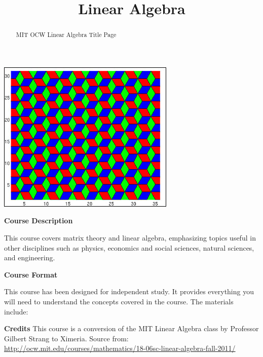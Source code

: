 \documentclass{ximera}
\title{Linear Algebra}
\begin{document}
\begin{abstract}
  MIT OCW Linear Algebra Title Page
\end{abstract}\maketitle

\begin{center}
\includegraphics{Main.jpg}
\end{center}
\noindent
\textbf{Course Description}
\par
\noindent
This course covers matrix theory and linear algebra, emphasizing topics useful in other disciplines such as physics, economics and social sciences, natural sciences, and engineering.
\par
\noindent
\textbf{Course Format}
\par
\noindent
This course has been designed for independent study. It provides everything you will need to understand the concepts covered in the course. The materials include:
\par
\noindent
\textbf{Credits}
This course is a conversion of the MIT Linear Algebra class by Professor Gilbert Strang to Ximeria. Source from: \\
\url{http://ocw.mit.edu/courses/mathematics/18-06sc-linear-algebra-fall-2011/}
\end{document}
